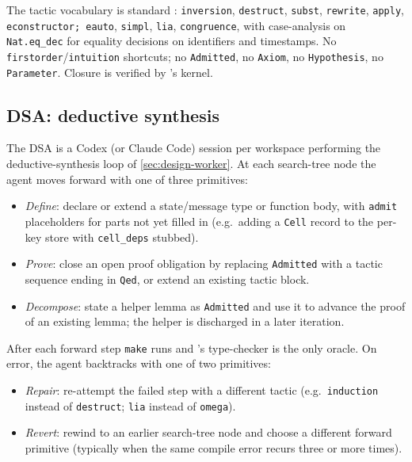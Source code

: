 The tactic vocabulary is standard \coq{}: \texttt{inversion}, \texttt{destruct}, \texttt{subst}, \texttt{rewrite}, \texttt{apply}, \texttt{econstructor; eauto}, \texttt{simpl}, \texttt{lia}, \texttt{congruence}, with case-analysis on \texttt{Nat.eq\_dec} for equality decisions on identifiers and timestamps. No \texttt{firstorder}/\texttt{intuition} shortcuts; no \texttt{Admitted}, no \texttt{Axiom}, no \texttt{Hypothesis}, no \texttt{Parameter}. Closure is verified by \coq{}'s kernel.

\subsection{DSA: deductive synthesis}
\label{app:worker}

The DSA is a Codex (or Claude Code) session per workspace performing the deductive-synthesis loop of \cref{sec:design-worker}. At each search-tree node the agent moves forward with one of three primitives:
\begin{itemize}[leftmargin=*,itemsep=2pt,topsep=2pt]
\item \emph{Define}: declare or extend a state/message type or function body, with \texttt{admit} placeholders for parts not yet filled in (e.g.\ adding a \texttt{Cell} record to the per-key store with \texttt{cell\_deps} stubbed).
\item \emph{Prove}: close an open proof obligation by replacing \texttt{Admitted} with a tactic sequence ending in \texttt{Qed}, or extend an existing tactic block.
\item \emph{Decompose}: state a helper lemma as \texttt{Admitted} and use it to advance the proof of an existing lemma; the helper is discharged in a later iteration.
\end{itemize}

After each forward step \texttt{make} runs and \coq{}'s type-checker is the only oracle. On error, the agent backtracks with one of two primitives:
\begin{itemize}[leftmargin=*,itemsep=2pt,topsep=2pt]
\item \emph{Repair}: re-attempt the failed step with a different tactic (e.g.\ \texttt{induction} instead of \texttt{destruct}; \texttt{lia} instead of \texttt{omega}).
\item \emph{Revert}: rewind to an earlier search-tree node and choose a different forward primitive (typically when the same compile error recurs three or more times).
\end{itemize}

